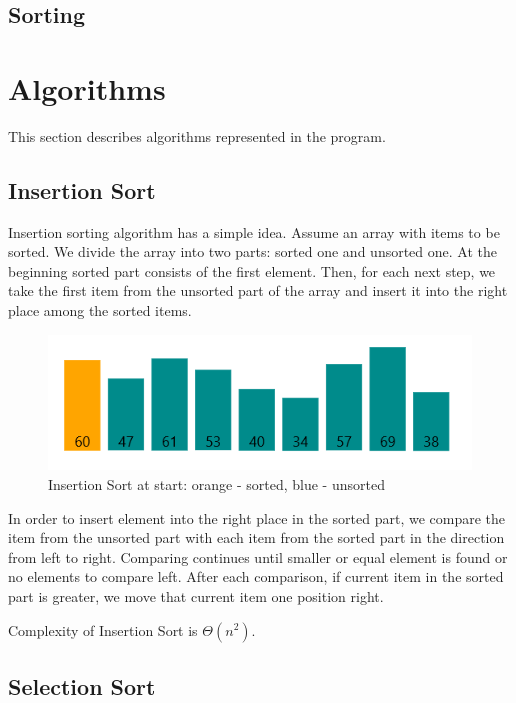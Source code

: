 \documentclass[
  field=inf,
  biblatex,
  language=english,
  glossaries,
  index
]{kidiplom}
\begin{document}
\subsection{Sorting}

\section{Algorithms}

This section describes algorithms represented in the program.

\subsection{Insertion Sort}
\label{sec:insertion}
Insertion sorting algorithm has a simple idea. Assume an array with items to be sorted. We divide the array into two parts: sorted one and unsorted one. At the beginning sorted part consists of the first element. Then, for each next step, we take the first item from the unsorted part of the array and insert it into the right place among the sorted items.

\begin{figure}[H]
\begin{center}
	
	\includegraphics[scale=0.7]{img/Insertion.png}
	\caption{Insertion Sort at start: orange - sorted, blue - unsorted}\label{fig:insert}
\end{center}
\end{figure}

In order to insert element into the right place in the sorted part, we compare the item from the unsorted part with each item from the sorted part in the direction from left to right. Comparing continues until smaller or equal element is found or no elements to compare left. After each comparison, if current item in the sorted part is greater, we move that current item one position right.

Complexity of Insertion Sort is $\Theta(n^2)$.

\subsection{Selection Sort}
\label{sec:selection}
\end{document}
